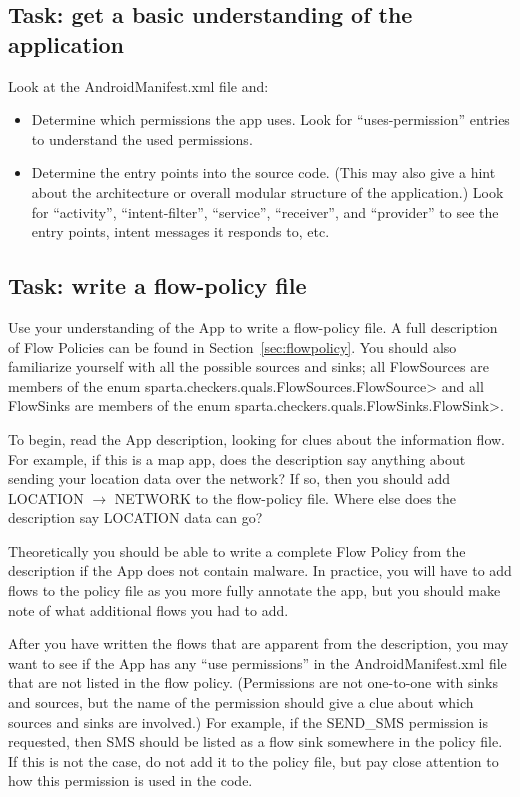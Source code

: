 \subsection{Task: get a basic understanding of the application}

Look at the AndroidManifest.xml file and:
\begin{itemize}
\item Determine which permissions the app uses.
  Look for ``uses-permission'' entries to understand the used
  permissions.
\item Determine the entry points into the source code. (This may also give
  a hint about the architecture or overall modular structure of the
  application.)
  Look for ``activity'', ``intent-filter'', ``service'', ``receiver'', and
  ``provider'' to see the entry points, intent messages it responds to,
  etc.
\end{itemize}

\subsection{Task: write a flow-policy file}

Use your understanding of the App to write a flow-policy file.  A full description of Flow Policies can be 
found in Section~\ref{sec:flowpolicy}.   You should also familiarize yourself with all the possible sources and sinks; 
 all FlowSources  are
members of the enum \<sparta.checkers.quals.FlowSources.FlowSource> and all FlowSinks are
members of the enum \<sparta.checkers.quals.FlowSinks.FlowSink>.

To begin, read the App description, looking for clues about the information flow.  For example,
if this is a map app, does the description say anything about sending your location data over the
 network?  If so, then you should add LOCATION $\rightarrow$ NETWORK to the flow-policy file.  Where
else does the description say LOCATION data can go?   

Theoretically you should be able to write a complete Flow Policy from the description 
if the App does not contain malware.  In practice, you will have to add flows to the policy file as you
 more fully annotate the app, but you should make note of what additional flows you had to add.
 
 After you have written the flows that are apparent from the description, you may want to see if the App
  has any ``use permissions'' in the AndroidManifest.xml file that are not listed in the flow policy. 
  (Permissions are not one-to-one with sinks and sources, but the name of the permission should give 
  a clue about which sources and sinks are involved.)  For example, if the SEND\_SMS permission is 
  requested, then SMS should be listed as a flow sink somewhere in the policy file.  If this is not the 
  case, do not add it to the policy file, but pay close attention to how this permission is used in the 
  code.


